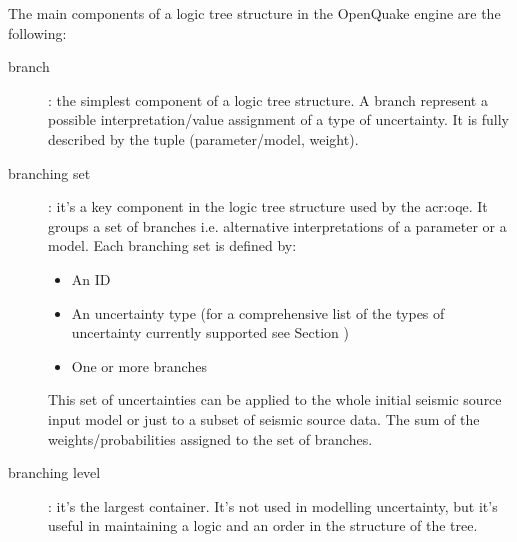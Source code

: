 The main components of a logic tree structure in the OpenQuake engine are 
the following:
\begin{description}
    \item[branch]: the simplest component of a logic tree structure. 
    A branch represent a possible interpretation/value assignment of 
    a type of uncertainty. It is fully described by the tuple 
    (parameter/model, weight).
    
    \item[branching set]: it's a key component in the logic tree structure 
    used by the \gls{acr:oqe}. It groups a set of branches i.e. 
    alternative interpretations of a parameter or a model. Each branching
    set is defined by:
    \begin{itemize}
        \item An ID 
        \item An uncertainty type (for a comprehensive list of the types of 
        uncertainty currently supported see Section )
        \item One or more branches
    \end{itemize}
    
    This set of uncertainties can be applied to the whole initial 
    seismic source input model or just to a subset of seismic source
    data. The sum of the weights/probabilities assigned to the set 
    of branches. 

    \item[branching level]: it's the largest container. It's not used in 
    modelling uncertainty, but it's useful in maintaining a logic and an 
    order in the structure of the tree.
\end{description}

